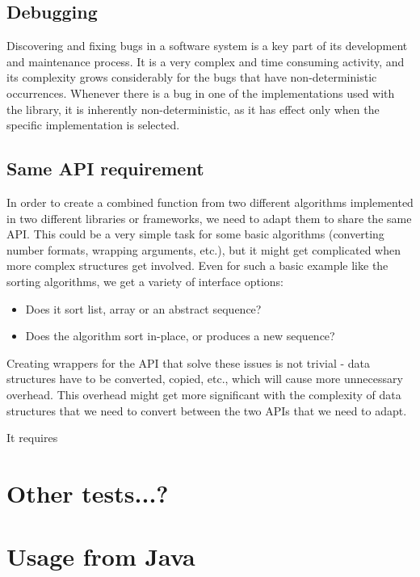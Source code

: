 \subsection{Debugging}

Discovering and fixing bugs in a software system is a key part of its development and maintenance process. It is a very complex and time consuming activity, and its complexity grows considerably for the bugs that have non-deterministic occurrences. Whenever there is a bug in one of the implementations used with the library, it is inherently non-deterministic, as it has effect only when the specific implementation is selected.

\subsection{Same API requirement}

In order to create a combined function from two different algorithms implemented in two different libraries or frameworks, we need to adapt them to share the same API. This could be a very simple task for some basic algorithms (converting number formats, wrapping arguments, etc.), but it might get complicated when more complex structures get involved. Even for such a basic example like the sorting algorithms, we get a variety of interface options:

\begin{itemize}
	\item Does it sort list, array or an abstract sequence?
	\item Does the algorithm sort in-place, or produces a new sequence?
\end{itemize}

Creating wrappers for the API that solve these issues is not trivial - data structures have to be converted, copied, etc., which will cause more unnecessary overhead. This overhead might get more significant with the complexity of data structures that we need to convert between the two APIs that we need to adapt.

It requires 

\section{Other tests...?}

\section{Usage from Java}

